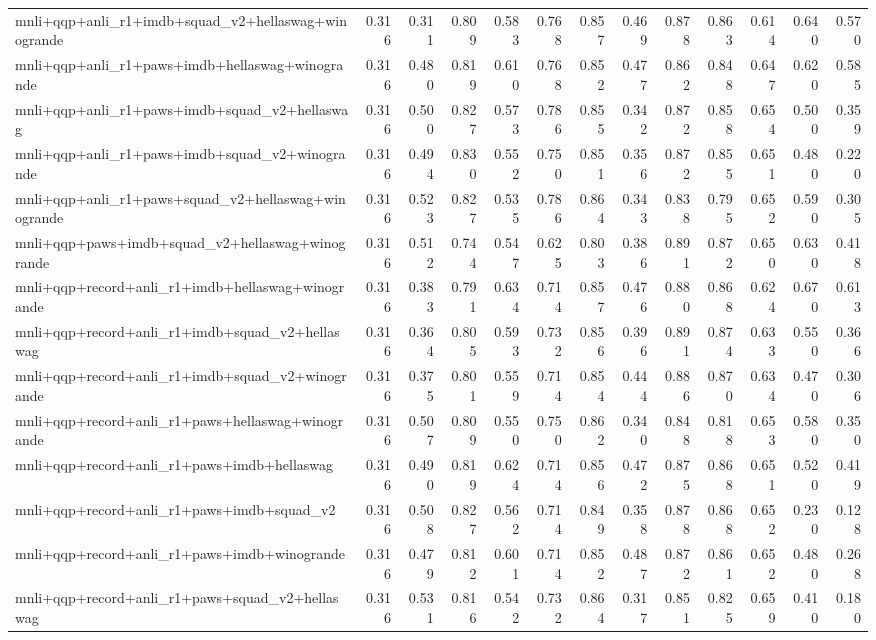 \begin{table}[t]
\begin{tabular}{lrrrrrrrrrrrr}
    mnli+qqp+anli\_r1+imdb+squad\_v2+hellaswag+winogrande & 0.316 & 0.311 & 0.809 & 0.583 & 0.768 & 0.857 & 0.469 & 0.878 & 0.863 & 0.614 & 0.640 & 0.570 \\
    mnli+qqp+anli\_r1+paws+imdb+hellaswag+winogrande & 0.316 & 0.480 & 0.819 & 0.610 & 0.768 & 0.852 & 0.477 & 0.862 & 0.848 & 0.647 & 0.620 & 0.585 \\
    mnli+qqp+anli\_r1+paws+imdb+squad\_v2+hellaswag & 0.316 & 0.500 & 0.827 & 0.573 & 0.786 & 0.855 & 0.342 & 0.872 & 0.858 & 0.654 & 0.500 & 0.359 \\
    mnli+qqp+anli\_r1+paws+imdb+squad\_v2+winogrande & 0.316 & 0.494 & 0.830 & 0.552 & 0.750 & 0.851 & 0.356 & 0.872 & 0.855 & 0.651 & 0.480 & 0.220 \\
    mnli+qqp+anli\_r1+paws+squad\_v2+hellaswag+winogrande & 0.316 & 0.523 & 0.827 & 0.535 & 0.786 & 0.864 & 0.343 & 0.838 & 0.795 & 0.652 & 0.590 & 0.305 \\
    mnli+qqp+paws+imdb+squad\_v2+hellaswag+winogrande & 0.316 & 0.512 & 0.744 & 0.547 & 0.625 & 0.803 & 0.386 & 0.891 & 0.872 & 0.650 & 0.630 & 0.418 \\
    mnli+qqp+record+anli\_r1+imdb+hellaswag+winogrande & 0.316 & 0.383 & 0.791 & 0.634 & 0.714 & 0.857 & 0.476 & 0.880 & 0.868 & 0.624 & 0.670 & 0.613 \\
    mnli+qqp+record+anli\_r1+imdb+squad\_v2+hellaswag & 0.316 & 0.364 & 0.805 & 0.593 & 0.732 & 0.856 & 0.396 & 0.891 & 0.874 & 0.633 & 0.550 & 0.366 \\
    mnli+qqp+record+anli\_r1+imdb+squad\_v2+winogrande & 0.316 & 0.375 & 0.801 & 0.559 & 0.714 & 0.854 & 0.444 & 0.886 & 0.870 & 0.634 & 0.470 & 0.306 \\
    mnli+qqp+record+anli\_r1+paws+hellaswag+winogrande & 0.316 & 0.507 & 0.809 & 0.550 & 0.750 & 0.862 & 0.340 & 0.848 & 0.818 & 0.653 & 0.580 & 0.350 \\
    mnli+qqp+record+anli\_r1+paws+imdb+hellaswag & 0.316 & 0.490 & 0.819 & 0.624 & 0.714 & 0.856 & 0.472 & 0.875 & 0.868 & 0.651 & 0.520 & 0.419 \\
    mnli+qqp+record+anli\_r1+paws+imdb+squad\_v2 & 0.316 & 0.508 & 0.827 & 0.562 & 0.714 & 0.849 & 0.358 & 0.878 & 0.868 & 0.652 & 0.230 & 0.128 \\
    mnli+qqp+record+anli\_r1+paws+imdb+winogrande & 0.316 & 0.479 & 0.812 & 0.601 & 0.714 & 0.852 & 0.487 & 0.872 & 0.861 & 0.652 & 0.480 & 0.268 \\
    mnli+qqp+record+anli\_r1+paws+squad\_v2+hellaswag & 0.316 & 0.531 & 0.816 & 0.542 & 0.732 & 0.864 & 0.317 & 0.851 & 0.825 & 0.659 & 0.410 & 0.180 \\

\end{tabular}
\end{table}
